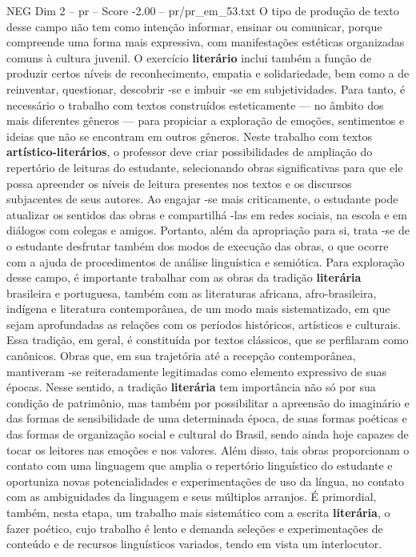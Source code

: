 \begin{textsample}{NEG Dim 2 – pr – Score -2.00 – pr/pr\_em\_53.txt}
O tipo de produção de texto desse campo não tem como intenção informar, ensinar ou comunicar, porque compreende uma forma mais expressiva, com manifestações estéticas organizadas comuns à cultura juvenil.
O exercício \textbf{literário} inclui também a função de produzir certos níveis de reconhecimento, empatia e solidariedade, bem como a de reinventar, questionar, descobrir -se e imbuir -se em subjetividades.
Para tanto, é necessário o trabalho com textos construídos esteticamente — no âmbito dos mais diferentes gêneros — para propiciar a exploração de emoções, sentimentos e ideias que não se encontram em outros gêneros.
Neste trabalho com textos \textbf{artístico-literários}, o professor deve criar possibilidades de ampliação do repertório de leituras do estudante, selecionando obras significativas para que ele possa apreender os níveis de leitura presentes nos textos e os discursos subjacentes de seus autores.
Ao engajar -se mais criticamente, o estudante pode atualizar os sentidos das obras e compartilhá -las em redes sociais, na escola e em diálogos com colegas e amigos.
Portanto, além da apropriação para si, trata -se de o estudante desfrutar também dos modos de execução das obras, o que ocorre com a ajuda de procedimentos de análise linguística e semiótica.
Para exploração desse campo, é importante trabalhar com as obras da tradição \textbf{literária} brasileira e portuguesa, também com as literaturas africana, afro-brasileira, indígena e literatura contemporânea, de um modo mais sistematizado, em que sejam aprofundadas as relações com os períodos históricos, artísticos e culturais.
Essa tradição, em geral, é constituída por textos clássicos, que se perfilaram como canônicos.
Obras que, em sua trajetória até a recepção contemporânea, mantiveram -se reiteradamente legitimadas como elemento expressivo de suas épocas.
Nesse sentido, a tradição \textbf{literária} tem importância não só por sua condição de patrimônio, mas também por possibilitar a apreensão do imaginário e das formas de sensibilidade de uma determinada época, de suas formas poéticas e das formas de organização social e cultural do Brasil, sendo ainda hoje capazes de tocar os leitores nas emoções e nos valores.
Além disso, tais obras proporcionam o contato com uma linguagem que amplia o repertório linguístico do estudante e oportuniza novas potencialidades e experimentações de uso da língua, no contato com as ambiguidades da linguagem e seus múltiplos arranjos.
É primordial, também, nesta etapa, um trabalho mais sistemático com a escrita \textbf{literária}, o fazer poético, cujo trabalho é lento e demanda seleções e experimentações de conteúdo e de recursos linguísticos variados, tendo em vista um interlocutor.

\end{textsample}
